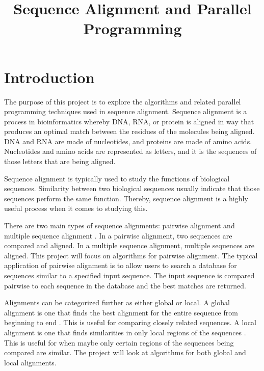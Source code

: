 \documentclass[conference]{IEEEtran}
\begin{document}
\title{Sequence Alignment and Parallel Programming}

\author{
\and
{}
\and
{}
}

\maketitle


\section{Introduction}
The purpose of this project is to explore the algorithms and related parallel programming techniques used in sequence alignment. Sequence alignment is a process in bioinformatics whereby DNA, RNA, or protein is aligned in way that produces an optimal match between the residues of the molecules being aligned. DNA and RNA are made of nucleotides, and proteins are made of amino acids. Nucleotides and amino acids are represented as letters, and it is the sequences of those letters that are being aligned.

Sequence alignment is typically used to study the functions of biological sequences. Similarity between two biological sequences usually indicate that those sequences perform the same function. Thereby, sequence alignment is a highly useful process when it comes to studying this.

There are two main types of sequence alignments: pairwise alignment and multiple sequence alignment \cite{chaudhary_liu_matta_yang_2005}. In a pairwise alignment, two sequences are compared and aligned. In a multiple sequence alignment, multiple sequences are aligned. This project will focus on algorithms for pairwise alignment. The typical application of pairwise alignment is to allow users to search a database for sequences similar to a specified input sequence. The input sequence is compared pairwise to each sequence in the database and the best matches are returned.

Alignments can be categorized further as either global or local. A global alignment is one that finds the best alignment for the entire sequence from beginning to end \cite{global_alignment}. This is useful for comparing closely related sequences. A local alignment is one that finds similarities in only local regions of the sequences \cite{global_alignment}. This is useful for when maybe only certain regions of the sequences being compared are similar. The project will look at algorithms for both global and local alignments.
\end{document}

